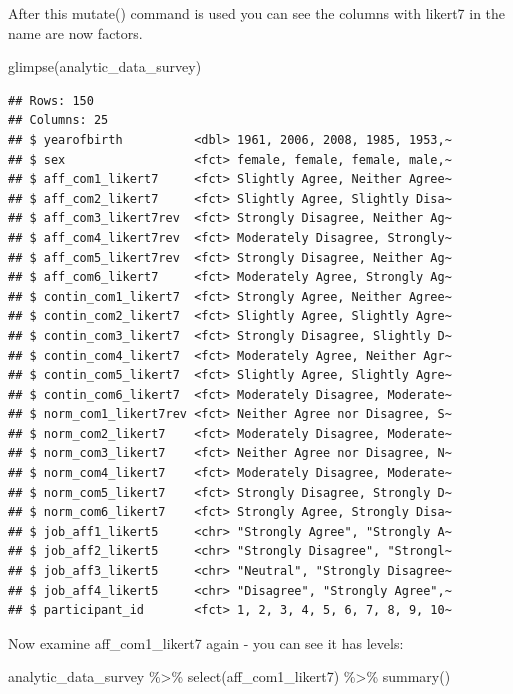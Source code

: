 \documentclass[
]{krantz}
\makeatletter
\newenvironment{Shaded}{\begin{snugshade}}{\end{snugshade}}
\newcommand{\FunctionTok}[1]{\textcolor[rgb]{0,0,0}{#1}}
\newcommand{\NormalTok}[1]{#1}
\newcommand{\SpecialCharTok}[1]{\textcolor[rgb]{0,0,0}{#1}}
\newenvironment{kframe}{%
\medskip{}
\setlength{\fboxsep}{.8em}
 \def\at@end@of@kframe{}%
 \ifinner\ifhmode%
  \def\at@end@of@kframe{\end{minipage}}%
  \begin{minipage}{\columnwidth}%
 \fi\fi%
 \def\FrameCommand##1{\hskip\@totalleftmargin \hskip-\fboxsep
 \colorbox{shadecolor}{##1}\hskip-\fboxsep
     \hskip-\linewidth \hskip-\@totalleftmargin \hskip\columnwidth}%
 \MakeFramed {\advance\hsize-\width
   \@totalleftmargin\z@ \linewidth\hsize
   \@setminipage}}%
 {\par\unskip\endMakeFramed%
 \at@end@of@kframe}
\renewenvironment{Shaded}{\begin{kframe}}{\end{kframe}}
\makeatother
\begin{document}
After this mutate() command is used you can see the columns with likert7 in the name are now factors.

\begin{Shaded}
\begin{Highlighting}[]
\FunctionTok{glimpse}\NormalTok{(analytic\_data\_survey)}
\end{Highlighting}
\end{Shaded}

\begin{verbatim}
## Rows: 150
## Columns: 25
## $ yearofbirth          <dbl> 1961, 2006, 2008, 1985, 1953,~
## $ sex                  <fct> female, female, female, male,~
## $ aff_com1_likert7     <fct> Slightly Agree, Neither Agree~
## $ aff_com2_likert7     <fct> Slightly Agree, Slightly Disa~
## $ aff_com3_likert7rev  <fct> Strongly Disagree, Neither Ag~
## $ aff_com4_likert7rev  <fct> Moderately Disagree, Strongly~
## $ aff_com5_likert7rev  <fct> Strongly Disagree, Neither Ag~
## $ aff_com6_likert7     <fct> Moderately Agree, Strongly Ag~
## $ contin_com1_likert7  <fct> Strongly Agree, Neither Agree~
## $ contin_com2_likert7  <fct> Slightly Agree, Slightly Agre~
## $ contin_com3_likert7  <fct> Strongly Disagree, Slightly D~
## $ contin_com4_likert7  <fct> Moderately Agree, Neither Agr~
## $ contin_com5_likert7  <fct> Slightly Agree, Slightly Agre~
## $ contin_com6_likert7  <fct> Moderately Disagree, Moderate~
## $ norm_com1_likert7rev <fct> Neither Agree nor Disagree, S~
## $ norm_com2_likert7    <fct> Moderately Disagree, Moderate~
## $ norm_com3_likert7    <fct> Neither Agree nor Disagree, N~
## $ norm_com4_likert7    <fct> Moderately Disagree, Moderate~
## $ norm_com5_likert7    <fct> Strongly Disagree, Strongly D~
## $ norm_com6_likert7    <fct> Strongly Agree, Strongly Disa~
## $ job_aff1_likert5     <chr> "Strongly Agree", "Strongly A~
## $ job_aff2_likert5     <chr> "Strongly Disagree", "Strongl~
## $ job_aff3_likert5     <chr> "Neutral", "Strongly Disagree~
## $ job_aff4_likert5     <chr> "Disagree", "Strongly Agree",~
## $ participant_id       <fct> 1, 2, 3, 4, 5, 6, 7, 8, 9, 10~
\end{verbatim}

Now examine aff\_com1\_likert7 again - you can see it has levels:

\begin{Shaded}
\begin{Highlighting}[]
\NormalTok{analytic\_data\_survey }\SpecialCharTok{\%\textgreater{}\%} 
    \FunctionTok{select}\NormalTok{(aff\_com1\_likert7) }\SpecialCharTok{\%\textgreater{}\%}
    \FunctionTok{summary}\NormalTok{()}
\end{Highlighting}
\end{Shaded}
\end{document}
